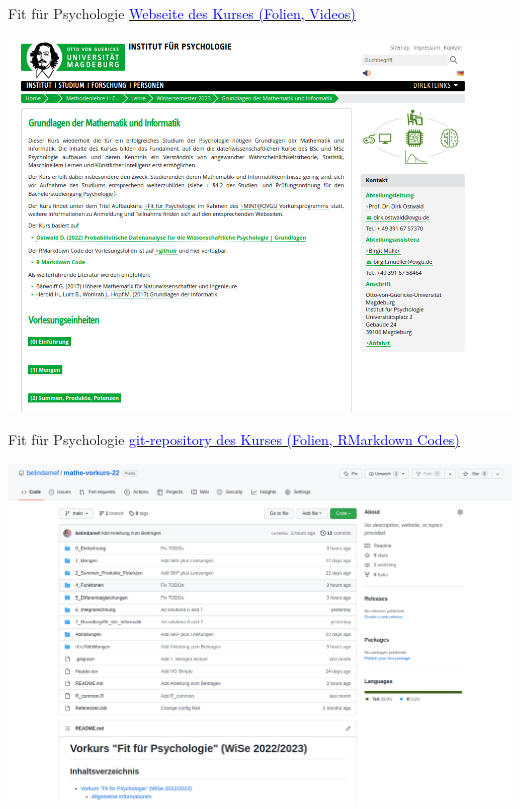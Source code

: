 \documentclass[
  8pt,
  ignorenonframetext,
  t]{beamer}
\begin{document}
\begin{frame}{Fit für Psychologie}
\protect\hypertarget{fit-fuxfcr-psychologie}{}
\href{https://www.ipsy.ovgu.de/Institut/Abteilungen+des+Institutes/Methodenlehre+I+_+Experimentelle+und+Neurowissenschaftliche+Psychologie/Lehre/Wintersemester+2023/Grundlagen+der+Mathematik+und+Informatik.html}{\textcolor{blue}{Webseite des Kurses (Folien, Videos)}}

\vspace{5mm}

\begin{center}\includegraphics[width=0.75\linewidth]{../Abbildungen/glmi_0_kursseite} \end{center}
\end{frame}

\begin{frame}{Fit für Psychologie}
\protect\hypertarget{fit-fuxfcr-psychologie-1}{}
\href{https://github.com/belindamef/mathe-vorkurs-22}{\textcolor{blue}{git-repository des Kurses (Folien, RMarkdown Codes)}}

\vspace{5mm}

\begin{center}\includegraphics[width=0.75\linewidth]{../Abbildungen/glmi_0_git_repo} \end{center}
\end{frame}
\end{document}
